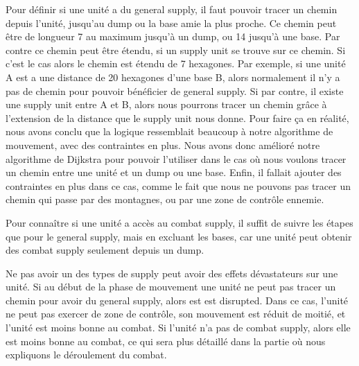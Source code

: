 Pour définir si une unité a du general supply, il faut pouvoir tracer un chemin depuis l'unité, jusqu'au dump ou la
base amie la plus proche. Ce chemin peut être de longueur 7 au maximum jusqu'à un dump, ou 14 jusqu'à une base. Par
contre ce chemin peut être étendu, si un supply unit se trouve sur ce chemin. Si c'est le cas alors le chemin est
étendu de 7 hexagones. Par exemple, si une unité A est a une distance de 20 hexagones d'une base B, alors normalement
il n'y a pas de chemin pour pouvoir bénéficier de general supply. Si par contre, il existe une supply unit entre
A et B, alors nous pourrons tracer un chemin grâce à l'extension de la distance que le supply unit nous donne.
Pour faire ça en réalité, nous avons conclu que la logique ressemblait beaucoup à notre algorithme de mouvement,
avec des contraintes en plus. Nous avons donc amélioré notre algorithme de Dijkstra pour pouvoir l'utiliser dans
le cas où nous voulons tracer un chemin entre une unité et un dump ou une base. Enfin, il fallait ajouter des
contraintes en plus dans ce cas, comme le fait que nous ne pouvons pas tracer un chemin qui passe par des montagnes,
ou par une zone de contrôle ennemie.

Pour connaître si une unité a accès au combat supply, il suffit de suivre les étapes que pour le general supply,
mais en excluant les bases, car une unité peut obtenir des combat supply seulement depuis un dump.

Ne pas avoir un des types de supply peut avoir des effets dévastateurs sur une unité. Si au début de la phase de
mouvement une unité ne peut pas tracer un chemin pour avoir du general supply, alors est est disrupted.
Dans ce cas, l'unité ne peut pas exercer de zone de contrôle, son mouvement est réduit de moitié, et l'unité est
moins bonne au combat. Si l'unité n'a pas de combat supply, alors elle est moins bonne au combat, ce qui sera plus
détaillé dans la partie où nous expliquons le déroulement du combat.